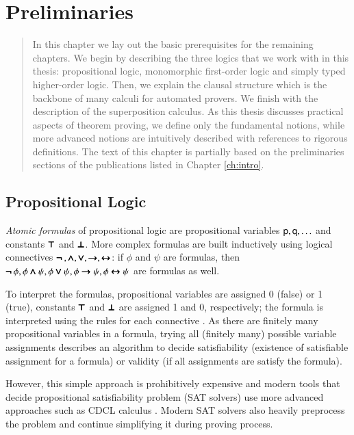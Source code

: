\chapter{Preliminaries}
\label{ch:pre}

\begin{abstract}
    In this chapter we lay out the basic prerequisites for the remaining
    chapters. We begin by describing the three logics that we work with in this
    thesis: propositional logic, monomorphic first-order logic and simply typed
    higher-order logic. Then, we explain the clausal structure which is the
    backbone of many calculi for automated provers. We finish with the
    description of the superposition calculus. As this thesis discusses practical
    aspects of theorem proving, we define only the fundamental notions, while
    more advanced notions are intuitively described with references to rigorous
    definitions. The text of this chapter is
    partially based on the preliminaries sections of the publications listed in
    Chapter \ref{ch:intro}.
    
\end{abstract}
      
\newpage


\section{Propositional Logic}

\emph{Atomic formulas} of propositional logic are propositional variables
$\mathsf{p}, \mathsf{q}, \ldots$ and constants $\pmb\top$ and $\pmb\bot$. More complex
formulas are built inductively using logical connectives $\pmb{\neg\,}, \pmb\land, \pmb\lor,
\pmb\rightarrow, \allowbreak \pmb\leftrightarrow$: if $\phi$ and $\psi$ are formulas, then $\pmb{\neg\,} \phi, \phi \pmb\land
\psi, \allowbreak \phi \pmb\lor \psi, \phi \pmb\rightarrow \psi, \phi \pmb\leftrightarrow \psi$ are formulas as well.

To interpret the formulas, propositional variables are assigned 0 (false) or 1
(true), constants $\pmb\top$ and $\pmb\bot$ are assigned 1 and 0, respectively; the
formula is interpreted using the rules for each connective
\cite[Sect.~1.4]{hr-00-logic-in-cs}. As there are finitely many propositional
variables in a formula, trying all (finitely many) possible variable assignments
describes an algorithm to decide satisfiability (existence of satisfiable
assignment for a formula) or validity (if all assignments are satisfy the formula).

However, this simple approach is prohibitively expensive and modern tools that
decide propositional satisfiability problem (SAT solvers) use more advanced
approaches such as CDCL calculus \cite{mss-96-cdcl}. Modern SAT solvers also
heavily preprocess the problem and continue simplifying it during proving
process.

